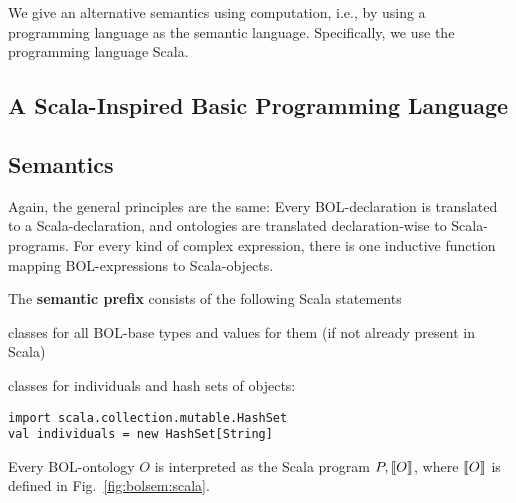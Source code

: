 We give an alternative semantics using computation, i.e., by using a programming language as the semantic language.
Specifically, we use the programming language Scala.

\subsection{A Scala-Inspired Basic Programming Language}\label{sec:wuv:bpl}
  

\subsection{Semantics}

Again, the general principles are the same:
Every BOL-declaration is translated to a Scala-declaration, and ontologies are translated declaration-wise to Scala-programs.
For every kind of complex expression, there is one inductive function mapping BOL-expressions to Scala-objects.

\begin{definition}\label{def:bolsem:scala}
The \textbf{semantic prefix} consists of the following Scala statements
\begin{compactitem}
 \item classes for all BOL-base types and values for them (if not already present in Scala)
 \item classes for individuals and hash sets of objects:
\begin{lstlisting}
import scala.collection.mutable.HashSet
val individuals = new HashSet[String]
\end{lstlisting}
\end{compactitem}

Every BOL-ontology $O$ is interpreted as the Scala program $P,\llbracket O\rrbracket$, where $\llbracket O\rrbracket$ is defined in Fig.~\ref{fig:bolsem:scala}.
\end{definition}

\newcommand{\rA}{\Rightarrow}

